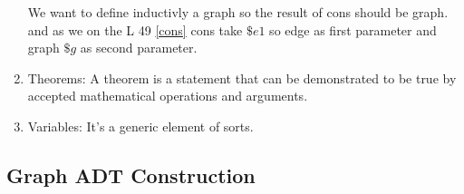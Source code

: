 \documentclass{article}
\begin{document}
\begin{enumerate}[label=\color{blue}\theenumi]
\bigskip\noindent

We want to define inductivly a graph so the result of cons should be graph.\\
and as we on the L 49 \ref{cons} cons take $\$e1$ so edge as first parameter and graph $\$g$ as second parameter.



\bigskip\noindent

\bigskip\noindent






\item \textcolor{colour0}{Theorems}\label{theorems}: A theorem is a statement that can be demonstrated to be true by accepted mathematical operations and arguments.

\item \textcolor{colour0}{Variables}\label{variables}: It's a generic element of sorts.
\end{enumerate}
\subsection{Graph ADT Construction}
\noindent

    
\bigskip\noindent


\bigskip\noindent






\end{document}
